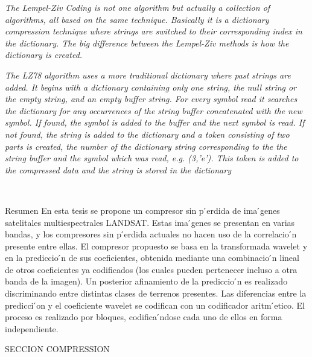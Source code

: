 \emph{The Lempel-Ziv Coding is not one algorithm but actually a collection of algorithms, all based on the same technique. Basically it is a dictionary compression technique where strings are switched to their corresponding index in the dictionary. The big difference between the Lempel-Ziv methods is how the dictionary is created. }~\cite{Mans Andersson}

\emph{The LZ78 algorithm uses a more traditional dictionary where past strings are added. It begins with a dictionary containing only one string, the null string or the empty string, and an empty buffer string. For every symbol read it searches the dictionary for any occurrences of the string buffer concatenated with the new symbol. If found, the symbol is added to the buffer and the next symbol is read. If not found, the string is added to the dictionary and a token consisting of two parts is created, the number of the dictionary string corresponding to the the string buffer and the symbol which was read, e.g. (3,’e’). This token is added to the compressed data and the string is stored in the dictionary}~\cite{Mans Andersson}



\emph{}~\cite{}
\emph{}~\cite{}
\emph{}~\cite{}
\emph{}~\cite{}
\emph{}~\cite{}
\emph{}~\cite{}





Resumen
En esta tesis se propone un compresor sin p ́erdida de ima ́genes satelitales multiespectrales LANDSAT. Estas ima ́genes se presentan en varias bandas, y los compresores sin p ́erdida actuales no hacen uso de la correlacio ́n presente entre ellas. El compresor propuesto se basa en la transformada wavelet y en la prediccio ́n de sus coeficientes, obtenida mediante una combinacio ́n lineal de otros coeficientes ya codificados (los cuales pueden pertenecer incluso a otra banda de la imagen). Un posterior afinamiento de la prediccio ́n es realizado discriminando entre distintas clases de terrenos presentes. Las diferencias entre la predicci ́on y el coeficiente wavelet se codifican con un codificador aritm ́etico. El proceso es realizado por bloques, codifica ́ndose cada uno de ellos en forma independiente.





SECCION COMPRESSION




